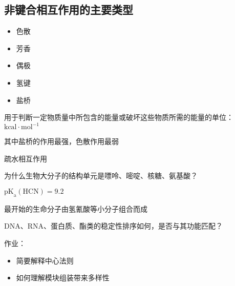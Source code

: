 \subsection{非键合相互作用的主要类型}%
\label{sub:非键合相互作用的主要类型}
\begin{itemize}
    \item 色散
    \item 芳香
    \item 偶极
    \item 氢键
    \item 盐桥
\end{itemize}
\begin{notation}
    用于判断一定物质量中所包含的能量或破坏这些物质所需的能量的单位：$\text{kcal}\cdot \text{mol}^{-1}$
\end{notation}
其中盐桥的作用最强，色散作用最弱
\begin{notation}
    疏水相互作用
\end{notation}
\begin{question}
为什么生物大分子的结构单元是嘌呤、嘧啶、核糖、氨基酸？
\end{question}
\begin{notation}
$\text{pK}_\text{a}\left( \text{HCN} \right)=9.2$

最开始的生命分子由氢氰酸等小分子组合而成
\end{notation}
\begin{question}
DNA、RNA、蛋白质、酯类的稳定性排序如何，是否与其功能匹配？
\end{question}
作业：
\begin{itemize}
    \item 简要解释中心法则
    \item 如何理解模块组装带来多样性
\end{itemize}
